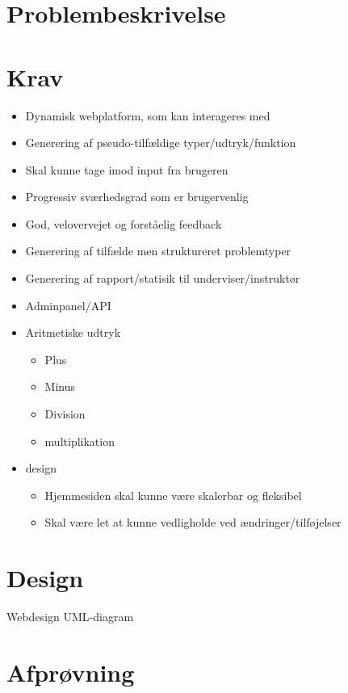 \documentclass[12pt, a4paper]{article}
\begin{document}
    

\section{Problembeskrivelse}

\section{Krav}
\begin{itemize}
  \item Dynamisk webplatform, som kan interageres med
  \item Generering af pseudo-tilfældige typer/udtryk/funktion
  \item Skal kunne tage imod input fra brugeren
  \item Progressiv sværhedsgrad som er brugervenlig
  \item God, velovervejet og forståelig feedback
  \item Generering af tilfælde men struktureret problemtyper
  \item Generering af rapport/statisik til underviser/instruktør
  \item Adminpanel/API
  \item Aritmetiske udtryk
    \begin{itemize}
      \item Plus
      \item Minus
      \item Division
      \item multiplikation
    \end{itemize}
  \item design
    \begin{itemize}
      \item Hjemmesiden skal kunne være skalerbar og fleksibel
      \item Skal være let at kunne vedligholde ved ændringer/tilføjelser
    \end{itemize}
\end{itemize}

\section{Design}

Webdesign
UML-diagram

\section{Afprøvning}
\end{document}
